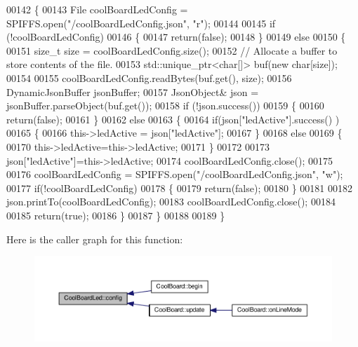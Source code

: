 \begin{DoxyCode}
00142 \{
00143     File coolBoardLedConfig = SPIFFS.open(\textcolor{stringliteral}{"/coolBoardLedConfig.json"}, \textcolor{stringliteral}{"r"});
00144 
00145     \textcolor{keywordflow}{if} (!coolBoardLedConfig) 
00146     \{
00147         \textcolor{keywordflow}{return}(\textcolor{keyword}{false});
00148     \}
00149     \textcolor{keywordflow}{else}
00150     \{
00151         \textcolor{keywordtype}{size\_t} size = coolBoardLedConfig.size();
00152         \textcolor{comment}{// Allocate a buffer to store contents of the file.}
00153         std::unique\_ptr<char[]> buf(\textcolor{keyword}{new} \textcolor{keywordtype}{char}[size]);
00154 
00155         coolBoardLedConfig.readBytes(buf.get(), size);
00156         DynamicJsonBuffer jsonBuffer;
00157         JsonObject& json = jsonBuffer.parseObject(buf.get());
00158         \textcolor{keywordflow}{if} (!json.success()) 
00159         \{
00160               \textcolor{keywordflow}{return}(\textcolor{keyword}{false});
00161         \} 
00162         \textcolor{keywordflow}{else}
00163         \{     
00164             \textcolor{keywordflow}{if}(json[\textcolor{stringliteral}{"ledActive"}].success() )
00165             \{
00166                 this->ledActive = json[\textcolor{stringliteral}{"ledActive"}]; 
00167             \}
00168             \textcolor{keywordflow}{else}
00169             \{
00170                 this->ledActive=this->ledActive;            
00171             \}
00172             
00173             json[\textcolor{stringliteral}{"ledActive"}]=this->ledActive;
00174             coolBoardLedConfig.close();
00175             
00176             coolBoardLedConfig = SPIFFS.open(\textcolor{stringliteral}{"/coolBoardLedConfig.json"}, \textcolor{stringliteral}{"w"});
00177             \textcolor{keywordflow}{if}(!coolBoardLedConfig)
00178             \{
00179                 \textcolor{keywordflow}{return}(\textcolor{keyword}{false});          
00180             \}
00181 
00182             json.printTo(coolBoardLedConfig);
00183             coolBoardLedConfig.close();
00184 
00185               \textcolor{keywordflow}{return}(\textcolor{keyword}{true}); 
00186         \}
00187     \}   
00188 
00189 \}               
\end{DoxyCode}
Here is the caller graph for this function\+:\nopagebreak
\begin{figure}[H]
\begin{center}
\leavevmode
\includegraphics[width=350pt]{class_cool_board_led_a1b60e5e30bea96c49ed62ed1bf1ffc8b_icgraph}
\end{center}
\end{figure}
\mbox{\label{class_cool_board_led_a69f323359e0c9f797422f2152b5d41ef}} 
